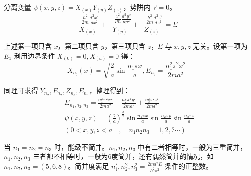 分离变量 $\psi(x,y,z) = X_(x)Y_(y)Z_(z) $，势阱内 $V=0$。\\
\begin{equation}
\frac{-\frac{\hbar^{2}}{2m}\frac{d^{2} {x}^{2}}{d{x^{2}}}}{X_(x)} + \frac{-\frac{\hbar^{2}}{2m}\frac{d^{2} {y}^{2}}{d{y^{2}}}}{Y_(y)} + \frac{-\frac{\hbar^{2}}{2m}\frac{d^{2} {z}^{2}}{d{z^{2}}}}{Z_(z)} = E
\end{equation}

上述第一项只含 $x$，第二项只含 $y$，第三项只含 $z$，$E$ 与 $x,y,z$ 无关。设第一项为 $E_1$ 利用边界条件 $X_{(0)} = 0,X_{(a)} = 0$ 得：\\
\begin{equation}
X_{n_1}(x) = \sqrt{\frac{2}{a}} \sin{\frac{n_{1} \pi x}{a}},E_{n_1} = \frac{n^2_1 \pi^2 x^2}{2ma^2}
\end{equation}

同理可求得 $Y_{n_2},E_{n_2},Z_{n_3},E_{n_3} $，整理得到：\\
\begin{equation}
\begin{aligned}
& E_{n_1,n_2,n_3} =\frac{n^2_1 \pi^2 x^2}{2ma^2}+\frac{n^2_2 \pi^2 y^2}{2ma^2}+\frac{n^2_3 \pi^2 z^2}{2ma^2} \\
& \psi(x,y,z) = (\frac{2}{a})^{\frac{3}{2}} \sin{\frac{n_1 \pi x}{a}} \sin{\frac{n_2 \pi y}{a}} \sin{\frac{n_3 \pi z}{a}} \\
& (0<x,y,z<a \quad , \quad n_1 n_2 n_3 = 1,2,3 \cdots)
\end{aligned}
\end{equation}

当 $n_1 = n_2 = n_3$ 时，能级不简并。$n_1 , n_2 , n_3 $ 中有二者相等时，一般为三重简并，$n_1 , n_2 , n_3 $ 三者都不相等时，一般为6度简并，还有偶然简并的情况，如 $n_1 , n_2 , n_3 =(5,6,8) $。简并度满足 $\displaystyle n^2_1 , n^2_2 , n^2_3 = \frac{2ma^2 E}{\hbar^2 \pi^2}$ 条件的正整数。

